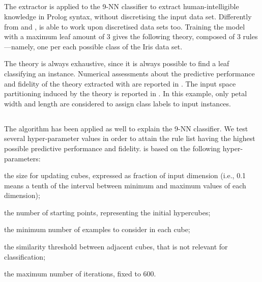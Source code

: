 \documentclass[
]{ceurart}
\begin{document}


\subsection{\cart{}}



The \cart{} extractor is applied to the 9-NN classifier to extract human-intelligible knowledge in Prolog syntax, without discretising the input data set.
%
Differently from \iter{} and \gridex{}, \cart{} is able to work upon discretised data sets too.
%
Training the model with a maximum leaf amount of 3 gives the following theory, composed of 3 rules---namely, one per each possible class of the Iris data set.


The theory is always exhaustive, since it is always possible to find a leaf classifying an instance.
%
Numerical assessments about the predictive performance and fidelity of the theory extracted with \cart{} are reported in .
%
The input space partitioning induced by the theory is reported in .
%
In this example, only petal width and length are considered to assign class labels to input instances.

\subsection{\iter{}}



The \iter{} algorithm has been applied as well to explain the 9-NN classifier.
%
We test several hyper-parameter values in order to attain the rule list having the highest possible predictive performance and fidelity.
%
\iter{} is based on the following hyper-parameters:
%
\begin{inlinelist}
	\item the size for updating cubes, expressed as fraction of input dimension (i.e., 0.1 means a tenth of the interval between minimum and maximum values of each dimension);
	\item the number of starting points, representing the initial hypercubes;
	\item the minimum number of examples to consider in each cube;
	\item the similarity threshold between adjacent cubes, that is not relevant for classification;
	\item the maximum number of iterations, fixed to 600.
\end{inlinelist}
\end{document}

